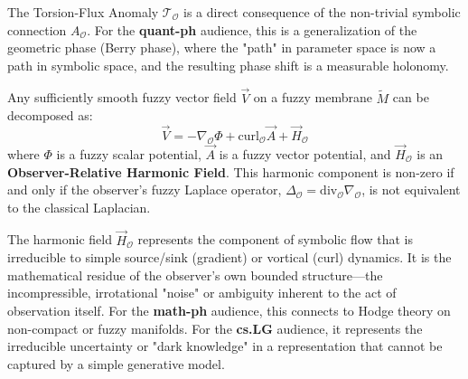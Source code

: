 \begin{scholium}
\label{scholium:bk4_torsion_flux_anomaly}
The Torsion-Flux Anomaly $\mathcal{T}_{\mathcal{O}}$ is a direct consequence of the non-trivial symbolic connection $A_{\mathcal{O}}$. For the \textbf{quant-ph} audience, this is a generalization of the geometric phase (Berry phase), where the "path" in parameter space is now a path in symbolic space, and the resulting phase shift is a measurable holonomy.
\end{scholium}

\begin{theorem}
\label{theorem:bk4_fuzzy_helmholtz_decomposition}
Any sufficiently smooth fuzzy vector field $\vec{V}$ on a fuzzy membrane $\tilde{M}$ can be decomposed as:
\[
\vec{V} = -\nabla_{\mathcal{O}} \Phi + \text{curl}_{\mathcal{O}} \vec{A} + \vec{H}_{\mathcal{O}}
\]
where $\Phi$ is a fuzzy scalar potential, $\vec{A}$ is a fuzzy vector potential, and $\vec{H}_{\mathcal{O}}$ is an \textbf{Observer-Relative Harmonic Field}. This harmonic component is non-zero if and only if the observer's fuzzy Laplace operator, $\Delta_{\mathcal{O}} = \text{div}_{\mathcal{O}} \nabla_{\mathcal{O}}$, is not equivalent to the classical Laplacian.
\end{theorem}

\begin{scholium}
\label{scholium:bk4_dark_knowledge}
The harmonic field $\vec{H}_{\mathcal{O}}$ represents the component of symbolic flow that is irreducible to simple source/sink (gradient) or vortical (curl) dynamics. It is the mathematical residue of the observer's own bounded structure—the incompressible, irrotational "noise" or ambiguity inherent to the act of observation itself. For the \textbf{math-ph} audience, this connects to Hodge theory on non-compact or fuzzy manifolds. For the \textbf{cs.LG} audience, it represents the irreducible uncertainty or "dark knowledge" in a representation that cannot be captured by a simple generative model.
\end{scholium}